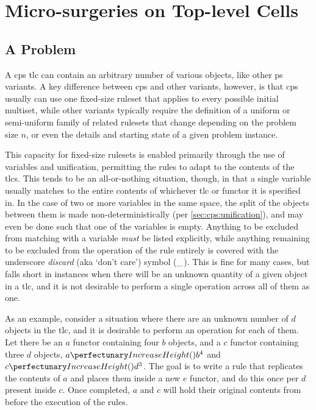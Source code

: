 \section{Micro-surgeries on  Top-level Cells}
\subsection{A Problem}
A \gls{cps} \gls{tlc} can contain an arbitrary number of various objects, like other \gls{ps} variants.  A key difference between \gls{cps} and other variants, however, is that \gls{cps} usually can use one fixed-size \gls{ruleset} that applies to every possible initial multiset, while other variants typically require the definition of a uniform or semi-uniform family of related \glspl{ruleset} that change depending on the problem size \(n\), or even the details and starting state of a given problem instance.

This capacity for fixed-size \glspl{ruleset} is enabled primarily through the use of variables and unification, permitting the rules to adapt to the contents of the \glspl{tlc}.  This tends to be an all-or-nothing situation, though, in that a single variable usually matches to the entire contents of whichever \gls{tlc} or \gls{functor} it is specified in.  In the case of two or more variables in the same space, the split of the objects between them is made non-deterministically (per \cref{sec:cps:unification}), and may even be done such that one of the variables is empty.  Anything to be excluded from matching with a variable \emph{must} be listed explicitly, while anything remaining to be excluded from the operation of the rule entirely is covered with the underscore \emph{discard} (aka `don't care') symbol (\(\_\)).  This is fine for many cases, but falls short in instances when there will be an unknown quantity of a given object in a \gls{tlc}, and it is not desirable to perform a single operation across all of them as one.

As an example, consider a situation where there are an unknown number of \(d\) objects in the \gls{tlc}, and it is desirable to perform an operation for each of them.  Let there be an \(a\) \gls{functor} containing four \(b\) objects, and a \(c\) \gls{functor} containing three \(d\) objects, \ie{} \(\cpfunc{a}{b^4}\) and \(\cpfunc{c}{d^3}\).  The goal is to write a rule that replicates the contents of \(a\) and places them inside a new \(e\) \gls{functor}, and do this once per \(d\) present inside \(c\).  Once completed, \(a\) and \(c\) will hold their original contents from before the execution of the rules.

